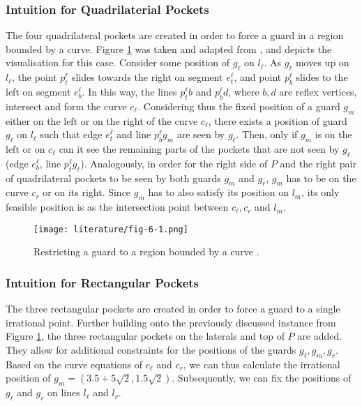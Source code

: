 \subsubsection{Intuition for Quadrilaterial Pockets}
The four quadrilateral pockets are created in order to force a guard in a region bounded by a curve. Figure \ref{fig:quadrilateral_pockets} was taken and adapted from \cite{1057165}, and depicts the visualisation for this case. 
Consider some position of $g_{\ell}$ on $l_{\ell}$. As $g_{\ell}$ moves up on $l_{\ell}$, the point $p^{\ell}_t$ slides towards the right on segment $e^{\ell}_t$, and point $p^{\ell}_b$ slides to the left on segment $e^{\ell}_b$. In this way, the lines $p^{\ell}_tb$ and $p^{\ell}_bd$, where $b, d$ are reflex vertices, intersect and form the curve $c_{\ell}$. Considering thus the fixed position of a guard $g_m$ either on the left or on the right of the curve $c_\ell$, there exists a position of guard $g_{\ell}$ on $l_{\ell}$ such that edge $e_t^{\ell}$ and line $p_b^{\ell}g_m$ are seen by $g_\ell$. Then, only if $g_m$ is on the left or on $c_\ell$ can it see the remaining parts of the pockets that are not seen by $g_\ell$ (edge $e_b^{\ell}$, line $p_t^{\ell}g_{\ell}$). Analogously, in order for the right side of $P$ and the right pair of quadrilateral pockets to be seen by both guards $g_m$ and $g_r$, $g_m$ has to be on the curve $c_r$ or on its right. Since $g_m$ has to also satisfy its position on $l_m$, its only feasible position is as the intersection point between $c_\ell, c_r$ and $l_m$. 

\begin{figure}[h!]
    \centering
    \texttt{[image: literature/fig-6-1.png]}
    \caption{Restricting a guard to a region bounded by a curve \cite{1057165}.}
    \label{fig:quadrilateral_pockets}
\end{figure}

\subsubsection{Intuition for Rectangular Pockets}
The three rectangular pockets are created in order to force a guard to a single irrational point. Further building onto the previously discussed instance from Figure \ref{fig:quadrilateral_pockets}, the three rectangular pockets on the laterals and top of $P$ are added.  They allow for additional constraints for the positions of the guards $g_\ell, g_m, g_r$. Based on the curve equations of $c_\ell$ and $c_r$, we can thus calculate the irrational position of $g_m = (3.5 + 5\sqrt 2, 1.5\sqrt 2)$. Subsequently, we can fix the positions of $g_\ell$ and $g_r$ on lines $l_\ell$ and $l_r$.

